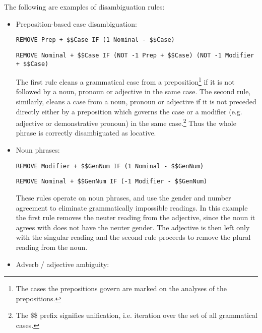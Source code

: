 \documentclass{book}
\begin{document}
The following are examples of disambiguation rules:
\begin{itemize}
\item Preposition-based case disambiguation:%


\texttt{REMOVE Prep + \$\$Case IF (1 Nominal - \$\$Case)}

\texttt{REMOVE Nominal + \$\$Case IF (NOT -1 Prep + \$\$Case) (NOT -1 Modifier + \$\$Case)}

The first rule cleans a grammatical case from a preposition\footnote{The cases the prepositions govern
are marked on the analyses of the prepositions.} 
if it is not followed by a noun, pronoun or adjective in the same case. The second
rule, similarly, cleans a case from a noun, pronoun or adjective if
it is not preceded directly either by a preposition which governs the case
or a modifier (e.g. adjective or demonstrative pronoun) in the same case.\footnote{The \$\$ prefix signifies unification, i.e. iteration over the set of all
grammatical cases.}
Thus the whole phrase is correctly disambiguated as locative.

\item Noun phrases:


\texttt{REMOVE Modifier + \$\$GenNum IF (1 Nominal - \$\$GenNum)}

\texttt{REMOVE Nominal + \$\$GenNum IF (-1 Modifier - \$\$GenNum)}

These rules operate on noun phrases, and use the gender and number agreement
to eliminate grammatically impossible readings. 
In this example the first rule removes the neuter reading from the 
adjective, since the noun it agrees with does not have the neuter gender.
The adjective is then left only with the singular reading and the second rule 
proceeds to remove the plural reading from the noun.

\pagebreak

\item Adverb / adjective ambiguity:

\enumsentence{

}
\end{itemize}
\end{document}
